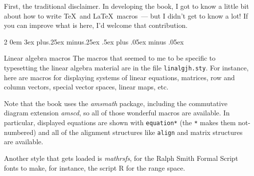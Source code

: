 \documentclass[titlepage]{article}
\makeatletter
\renewcommand{\subsection}{\@startsection{subsection}%
  {2}%
  {0em}%
  {3ex plus.25ex minus.25ex}%
  {.5ex plus .05ex minus .05ex}%
  {\large\bfseries\raggedright}}
\makeatother
\begin{document}
First, the traditional disclaimer.
In developing the book, I got to know a little bit about how to write
\TeX\ and \LaTeX\ macros~--- but I didn't get to know a lot!
If you can improve what is here, I'd welcome that contribution.


\subsection{Linear algebra macros}
The macros that seemed to me to be specific to typesetting the
linear algebra material are in the file 
\texttt{linalgjh.sty}.
For instance, here are macros for displaying systems of linear equations,
matrices, row and column vectors, special vector spaces, linear maps,
etc.

Note that the book uses the \textit{amsmath} package, 
including the commutative diagram extension \textit{amscd},
so all of those
wonderful macros are available.
In particular, displayed equations are shown with 
\verb|equation*| (the \texttt{*} makes them not-numbered) and all of the 
alignment structures like \verb|align| and matrix structures 
are available.

Another style that gets loaded is \textit{mathrsfs}, for the 
Ralph Smith Formal Script fonts to make, for instance, the script R
for the range space.
\end{document}
